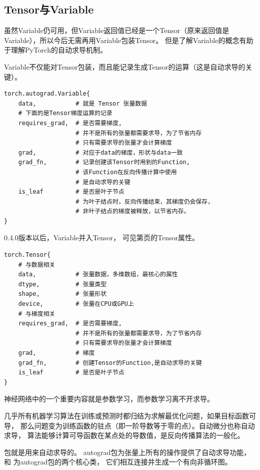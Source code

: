 \subsection{Tensor与Variable}
\label{subsubsec:Pytorch的Tensor与Variable}
虽然Variable仍可用，但Variable返回值已经是一个Tensor（原来返回值是Variable），所以今后无需再用Variable包装Tensor。
但是了解Variable的概念有助于理解PyTorch的自动求导机制。

Variable不仅能对Tensor包装，而且能记录生成Tensor的运算（这是自动求导的关键）。
\begin{lstlisting}[style=demostyle,numbers=none]
torch.autograd.Variable{
    data,           # 就是 Tensor 张量数据
    # 下面的是Tensor梯度运算的记录
    requires_grad,  # 是否需要梯度,
                    # 并不是所有的张量都需要求导，为了节省内存
                    # 只有需要求导的张量才会计算梯度
    grad,           # 对应于data的梯度，形状与data一致
    grad_fn,        # 记录创建该Tensor时用到的Function,
                    # 该Function在反向传播计算中使用
                    # 是自动求导的关键
    is_leaf         # 是否是叶子节点
                    # 为叶子结点时，反向传播结束，其梯度仍会保存，
                    # 非叶子结点的梯度被释放，以节省内存。
}
\end{lstlisting}

0.4.0版本以后，Variable并入Tensor，
可见第\pageref{subsec:Pytorch-Tensor的结构属性}页的Tensor属性。

\begin{lstlisting}[style=demostyle,numbers=none]
torch.Tensor{
    # 与数据相关
    data,           # 张量数据，多维数组，最核心的属性
    dtype,          # 张量类型
    shape,          # 张量形状
    device,         # 张量在CPU或GPU上
    # 与梯度相关
    requires_grad,  # 是否需要梯度,
                    # 并不是所有的张量都需要求导，为了节省内存
                    # 只有需要求导的张量才会计算梯度
    grad,           # 梯度
    grad_fn,        # 创建Tensor的Function,是自动求导的关键
    is_leaf         # 是否是叶子节点
}
\end{lstlisting}
神经网络中的一个重要内容就是参数学习，而参数学习离不开求导。

几乎所有机器学习算法在训练或预测时都归结为求解最优化问题，如果目标函数可导， 
那么问题变为训练函数的驻点（即一阶导数等于零的点）。自动微分也称自动求导，
算法能够计算可导函数在某点处的导数值，是反向传播算法的一般化。

包就是用来\textcolor{YBXPurple}{自动求导的}。
autograd包为张量上所有的操作提供了自动求导功能，和
为autograd包的两个核心类，
它们相互连接并生成一个有向非循环图。

